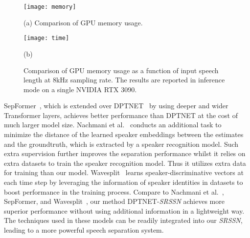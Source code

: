 \begin{figure*}
  \centering
  \begin{minipage}[b]{0.48\linewidth}
    \centering
    \texttt{[image: memory]}
    \centerline{(a) Comparison of GPU memory usage.}\medskip
  \end{minipage}
  \hspace{0.02\linewidth}
  \begin{minipage}[b]{0.48\linewidth}
    \centering
    \texttt{[image: time]}
    \centerline{(b) }\medskip
  \end{minipage}
  \caption{Comparison of GPU memory usage  as a function of input speech length at 8kHz sampling rate. The results are reported in inference mode on a single NVIDIA RTX 3090.}
  \label{fig:memory_time}
\end{figure*}

SepFormer~\cite{SepFormer}, which is extended over DPTNET~\cite{DPTNet} by using deeper and wider Transformer layers, achieves better performance than DPTNET at the cost of much larger model size. Nachmani et al.~\cite{MULCAT} conducts an additional task to minimize the distance of the learned speaker embeddings between the estimates and the groundtruth, which is extracted by a speaker recognition model. Such extra supervision further improves the separation performance whilst it relies on extra datasets to train the speaker recognition model. Thus it utilizes extra data for training than our model. Wavesplit~\cite{wavesplit} learns speaker-discriminative vectors at each time step by leveraging the information of speaker identities in datasets to boost performance in the training process. Compare to Nachmani et al.~\cite{MULCAT}, SepFormer\cite{SepFormer}, and Wavesplit~\cite{wavesplit}, our method DPTNET-\emph{SRSSN} achieves more superior performance without using additional information in a lightweight way. The techniques used in these models can be readily integrated into our \emph{SRSSN}, leading to a more powerful speech separation system. 


